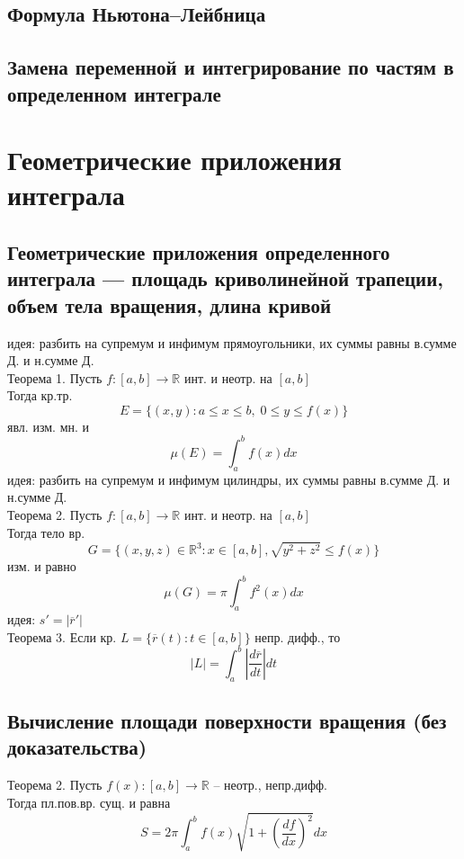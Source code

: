 \documentclass{article}
\begin{document}
\subsection{Формула Ньютона–Лейбница}
\subsection{Замена переменной и интегрирование по частям в определенном интеграле}


\section{Геометрические приложения интеграла}
\subsection{Геометрические приложения определенного интеграла — площадь криволинейной трапеции, объем тела вращения, длина кривой}
идея: разбить на супремум и инфимум прямоугольники, их суммы равны в.сумме Д. и н.сумме Д. \\
Теорема 1. Пусть $f:[a,b] \rightarrow \mathbb R$ инт. и неотр. на $[a,b]$ \\
Тогда кр.тр. 
\begin{equation*}
    E = \{ (x,y): a \leq x \leq b, \; 0 \leq y \leq f(x) \}
\end{equation*}
явл. изм. мн. и
\begin{equation*}
    \mu (E) = \int_a^b f(x) dx
\end{equation*}
идея: разбить на супремум и инфимум цилиндры, их суммы равны в.сумме Д. и н.сумме Д. \\
Теорема 2. Пусть $f:[a,b]\rightarrow\mathbb R$ инт. и неотр. на $[a,b]$ \\
Тогда тело вр.
\begin{equation*}
    G = \{ (x,y,z) \in \mathbb R^3: x \in [a,b], \sqrt{y^2+z^2} \leq f(x) \}
\end{equation*}
изм. и равно
\begin{equation*}
    \mu(G) = \pi \int_a^b f^2(x) dx
\end{equation*}
идея: $s' = |\overline{r}'|$ \\
Теорема 3. Если кр. $L = \{ \overline{r}(t): t \in [a,b] \}$ непр. дифф., то
\begin{equation*}
    |L| = \int_a^b |\frac{d\overline{r}}{dt}| dt
\end{equation*}
\subsection{Вычисление площади поверхности вращения (без
доказательства)}
Теорема 2. Пусть $f(x): [a,b] \rightarrow \mathbb R$ -- неотр., непр.дифф. \\
Тогда пл.пов.вр. сущ. и равна
\begin{equation*}
    S = 2\pi \int_a^b f(x) \sqrt{1+(\frac{df}{dx})^2}dx
\end{equation*}
\end{document}
